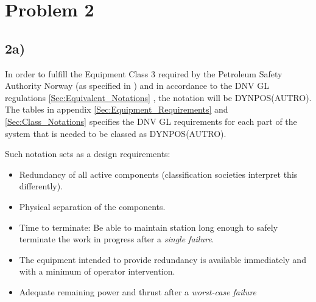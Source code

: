 \section*{Problem 2}
\subsection*{2a)}

In order to fulfill the Equipment Class 3 required by the Petroleum Safety Authority Norway (as specified in ) and in accordance to the DNV GL regulations \ref{Sec:Equivalent_Notations} \cite{RecommendedPractices_DP_DNVGL}, the notation will be DYNPOS(AUTRO). The tables in appendix \ref{Sec:Equipment_Requirements} and \ref{Sec:Class_Notations} specifies the DNV GL requirements for each part of the system that is needed to be classed as DYNPOS(AUTRO). 

Such notation sets as a design requirements:

\begin{itemize}
    \item Redundancy of all active components (classification societies interpret this differently).
    \item Physical separation of the components.
    \item Time to terminate: Be able to maintain station long enough to safely terminate the work in progress after a \textit{single failure}.
    \item The equipment intended to provide redundancy is available immediately and with a minimum of operator intervention.
    \item Adequate remaining power and thrust after a \textit{worst-case failure}
\end{itemize}

